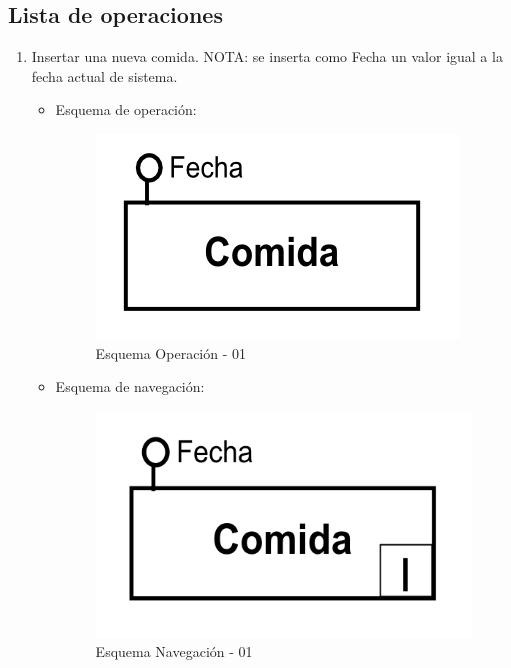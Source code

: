 \documentclass[a4paper,12pt]{report}
\begin{document}
\subsection{Lista de operaciones}
\label{sec-7-7-1}
\begin{enumerate}
\item Insertar una nueva comida.
NOTA: se inserta como Fecha un valor igual a la fecha actual de sistema.
\begin{itemize}
\item Esquema de operación:
\begin{figure}[!htp]
\centering
\includegraphics[width=0.9\linewidth]{./operaciones/img/Comidas/01_ope.png}
\caption{Esquema Operación - 01}
\label{fig:ope01}
\medskip
\footnotesize
{}
\end{figure}
\item Esquema de navegación:
\begin{figure}[!htp]
\centering
\includegraphics[width=0.9\linewidth]{./operaciones/img/Comidas/01_nav.png}
\caption{Esquema Navegación - 01}
\label{fig:nave01}
\medskip
\footnotesize
{}
\end{figure}
\end{itemize}


\end{enumerate}
\end{document}
